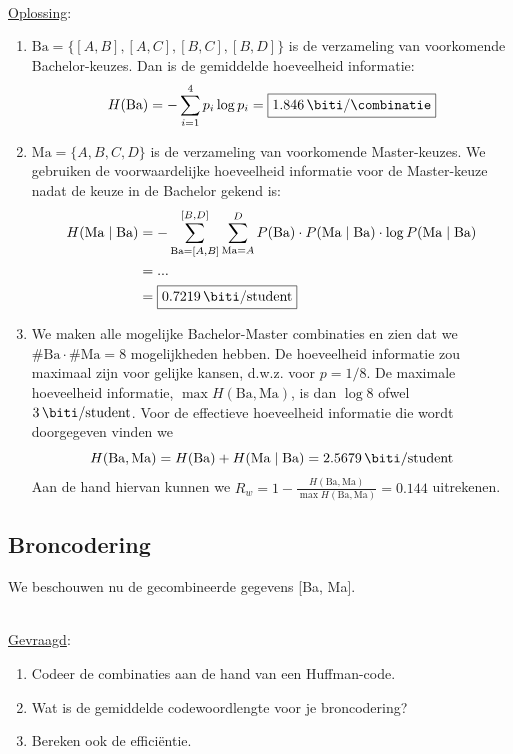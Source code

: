 \documentclass[kulak]{kulakarticle}
\begin{document}
	\hfill \\
	\underline{Oplossing}:
	\begin{enumerate}
		\item \( \text{Ba}=\{ [A,B], [A,C], [B,C], [B,D] \} \) is de verzameling van voorkomende Bachelor-keuzes. Dan is de gemiddelde hoeveelheid informatie: \[ H(\text{Ba})= - \sum_{i=1}^{4} p_i \log{p_i} = \boxed{\SI{1.846}{\biti \per \combinatie}} \]

		\item \( \text{Ma}=\{ A,B,C,D \} \) is de verzameling van voorkomende Master-keuzes.
		We gebruiken de voorwaardelijke hoeveelheid informatie voor de Master-keuze nadat de keuze in de Bachelor gekend is: \begin{align*}
			H(\text{Ma}\mid \text{Ba}) &= -\sum_{\text{Ba}=[A,B]}^{[B,D]}\sum_{\text{Ma}=A}^{D} P(\text{Ba})\cdot P(\text{Ma}\mid \text{Ba})\cdot \log{P(\text{Ma}\mid \text{Ba})} \\
			&= ... \\
			&= \boxed{\SI{0.7219}{\biti \per student}}
		\end{align*}

		\item We maken alle mogelijke Bachelor-Master combinaties en zien dat we \(\#\text{Ba} \cdot \#\text{Ma} = 8\) mogelijkheden hebben. De hoeveelheid informatie zou maximaal zijn voor gelijke kansen, d.w.z. voor \(p=1/8\). De maximale hoeveelheid informatie, \(\max H(\text{Ba}, \text{Ma})\), is dan \(\log{8}\) ofwel \(\SI{3}{\biti \per student}\). Voor de effectieve hoeveelheid informatie die wordt doorgegeven vinden we \[H(\text{Ba}, \text{Ma}) = H(\text{Ba}) + H(\text{Ma} \mid \text{Ba}) = \SI{2.5679}{\biti \per student} \] Aan de hand hiervan kunnen we \(R_w = 1 - \frac{H(\text{Ba}, \text{Ma})}{\max H(\text{Ba}, \text{Ma})} = \boxed{0.144}\) uitrekenen.
	\end{enumerate}

	\subsection{Broncodering}

	We beschouwen nu de gecombineerde gegevens [Ba, Ma].

	\hfill \\
	\underline{Gevraagd}:
	\begin{enumerate}
		\item Codeer de combinaties aan de hand van een Huffman-code.
		\item Wat is de gemiddelde codewoordlengte voor je broncodering?
		\item Bereken ook de efficiëntie.
	\end{enumerate}
\end{document}
